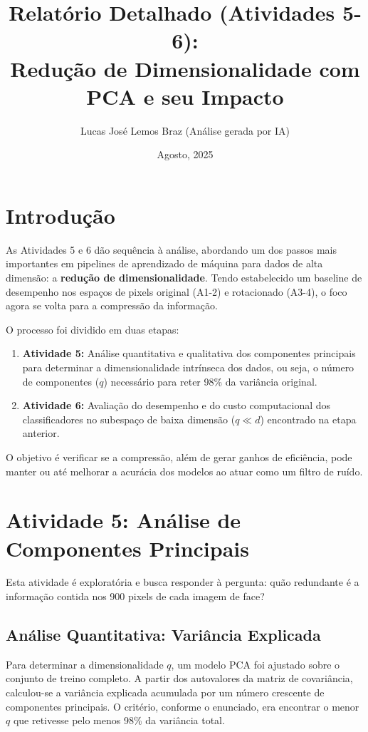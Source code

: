 \documentclass[a4paper,12pt]{article}
\title{Relatório Detalhado (Atividades 5-6): \\ Redução de Dimensionalidade com PCA e seu Impacto}
\author{Lucas José Lemos Braz (Análise gerada por IA)}
\date{Agosto, 2025}
\begin{document}
\maketitle

\section{Introdução}

As Atividades 5 e 6 dão sequência à análise, abordando um dos passos mais importantes em pipelines de aprendizado de máquina para dados de alta dimensão: a \textbf{redução de dimensionalidade}. Tendo estabelecido um baseline de desempenho nos espaços de pixels original (A1-2) e rotacionado (A3-4), o foco agora se volta para a compressão da informação.

O processo foi dividido em duas etapas:
\begin{enumerate}
    \item \textbf{Atividade 5:} Análise quantitativa e qualitativa dos componentes principais para determinar a dimensionalidade intrínseca dos dados, ou seja, o número de componentes (\(q\)) necessário para reter 98\% da variância original.
    \item \textbf{Atividade 6:} Avaliação do desempenho e do custo computacional dos classificadores no subespaço de baixa dimensão (\(q \ll d\)) encontrado na etapa anterior.
\end{enumerate}
O objetivo é verificar se a compressão, além de gerar ganhos de eficiência, pode manter ou até melhorar a acurácia dos modelos ao atuar como um filtro de ruído.

\section{Atividade 5: Análise de Componentes Principais}

Esta atividade é exploratória e busca responder à pergunta: quão redundante é a informação contida nos 900 pixels de cada imagem de face?

\subsection{Análise Quantitativa: Variância Explicada}

Para determinar a dimensionalidade \(q\), um modelo PCA foi ajustado sobre o conjunto de treino completo. A partir dos autovalores da matriz de covariância, calculou-se a variância explicada acumulada por um número crescente de componentes principais. O critério, conforme o enunciado, era encontrar o menor \(q\) que retivesse pelo menos 98\% da variância total.
\end{document}
